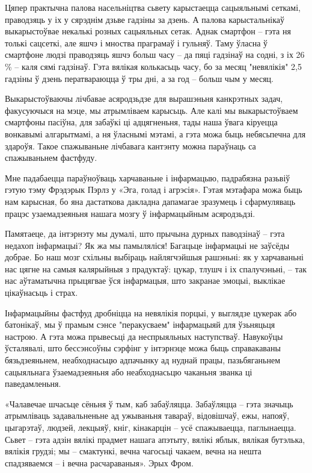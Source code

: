Цяпер практычна палова насельніцтва сьвету карыстаецца сацыяльнымі сеткамі, праводзяць у іх у сярэднім дзьве гадзіны за дзень. А палова карыстальнікаў выкарыстоўвае некалькі розных сацыяльных сетак. Аднак смартфон – гэта ня толькі сацсеткі, але яшчэ і мноства праграмаў і гульняў. Таму ўласна ў смартфоне людзі праводзяць яшчэ больш часу – да пяці гадзінаў на содні, з іх 26\,\% – каля сямі гадзінаў. Гэта вялікая колькасьць часу, бо за месяц "невялікія" 2,5 гадзіны ў дзень ператвараюцца ў тры дні, а за год – больш чым у месяц.

Выкарыстоўваючы лічбавае асяродзьдзе для вырашэньня канкрэтных задач, факусуючыся на мэце, мы атрымліваем карысьць. Але калі мы выкарыстоўваем смартфоны пасіўна, для забаўкі ці адцягненьня, тады наша ўвага кіруецца вонкавымі алгарытмамі, а ня ўласнымі мэтамі, а гэта можа быць небясьпечна для здароўя. Такое спажываньне лічбавага кантэнту можна параўнаць са спажываньнем фастфуду.

Мне падабаецца параўноўваць харчаваньне і інфармацыю, падрабязна разьвіў гэтую тэму Фрэдэрык Пэрлз у «Эга, голад і агрэсія». Гэтая мэтафара можа быць нам карысная, бо яна дастаткова дакладна дапамагае зразумець і сфармуляваць працэс узаемадзеяньня нашага мозгу ў інфармацыйным асяродзьдзі. 

Памятаеце, да інтэрнэту мы думалі, што прычына дурных паводзінаў – гэта недахоп інфармацыі? Як жа мы памыляліся! Багацьце інфармацыі не заўсёды добрае. Бо наш мозг схільны выбіраць найлягчэйшыя рашэньні: як у харчаваньні нас цягне на самыя калярыйныя з прадуктаў: цукар, тлушч і іх спалучэньні, – так нас аўтаматычна прыцягвае ўся інфармацыя, што закранае эмоцыі, выклікае цікаўнасьць і страх.

Інфармацыйны фастфуд дробніцца на невялікія порцыі, у выглядзе цукерак або батонікаў, мы ў прамым сэнсе "перакусваем" інфармацыяй для ўзьняцьця настрою. А гэта можа прывесьці да неспрыяльных наступстваў. Навукоўцы ўсталявалі, што бессэнсоўны сэрфінг у інтэрнэце можа быць справакаваны бязьдзеяньнем, неабходнасьцю адпачынку ад нуднай працы, пазьбяганьнем сацыяльнага ўзаемадзеяньня або неабходнасьцю чаканьня званка ці паведамленьня.

«Чалавечае шчасьце сёньня ў тым, каб забаўляцца. Забаўляцца – гэта значыць атрымліваць задавальненьне ад ужываньня тавараў, відовішчаў, ежы, напояў, цыгарэтаў, людзей, лекцыяў, кніг, кінакарцін – усё спажываецца, паглынаецца. Сьвет – гэта адзін вялікі прадмет нашага апэтыту, вялікі яблык, вялікая бутэлька, вялікія грудзі; мы – смактункі, вечна чагосьці чакаем, вечна на нешта спадзяваемся – і вечна расчараваныя». Эрых Фром. 

